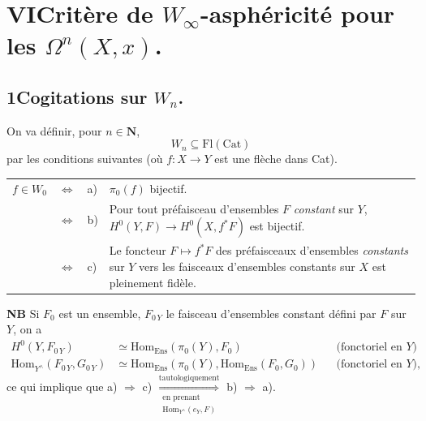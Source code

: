 \documentclass[11pt]{article}
\newcommand{\printedpage}[1]{\marginpar{\footnotesize p.~#1}}
\newcommand{\msp}[1]{\marginpar{\footnotesize [#1]}}
\newcommand{\HomEns}{\mathrm{Hom}_{\mathrm{Ens}}}
\begin{document}
\printedpage{115}

\msp{page 171}

\section*{VI\quad Critère de $W_\infty$-asphéricité pour les $\Omega^n(X,x)$.}

\subsection*{1\quad Cogitations sur $W_n$.}

On va définir, pour $n \in \mathbf{N}$,
\[
W_n \subseteq \mathrm{Fl}(\mathrm{Cat})
\]
par les conditions suivantes (où $f : X \longrightarrow Y$ est une flèche dans Cat).

\noindent\begin{tabular}{@{}l c l p{}@{}}
$f \in W_0$ & $\Longleftrightarrow$ & a) & $\pi_0(f)$ bijectif.\\
 & $\Longleftrightarrow$ & b) & Pour tout préfaisceau d'ensembles $F$ \textit{constant} sur $Y$, $H^0(Y,F) \longrightarrow H^0(X,f^*F)$ est bijectif.\\
 & $\Longleftrightarrow$ & c) & Le foncteur $F \longmapsto f^*F$ des préfaisceaux d'ensembles \textit{constants} sur $Y$ vers les faisceaux d'ensembles constants sur $X$ est pleinement fidèle.
\end{tabular}



\textbf{NB} Si $F_0$ est un ensemble, $F_{0\,Y}$ le faisceau d'ensembles constant défini par $F$ sur $Y$, on a
\[
\begin{aligned}
H^0(Y,F_{0\,Y}) &\simeq \HomEns(\pi_0(Y),F_0) && \text{(fonctoriel en $Y$)}\\
\mathrm{Hom}_{Y^\wedge}(F_{0\,Y},G_{0\,Y}) &\simeq \HomEns(\pi_0(Y),\HomEns(F_0,G_0)) && \text{(fonctoriel en $Y$),}
\end{aligned}
\]
ce qui implique que a) $\Longrightarrow$ c) $\underset{\substack{\text{en prenant}\\ \mathrm{Hom}_{Y^\wedge}(e_Y,F)}}{\overset{\text{tautologiquement}}{\Longrightarrow}}$ b) $\Longrightarrow$ a).
\end{document}
